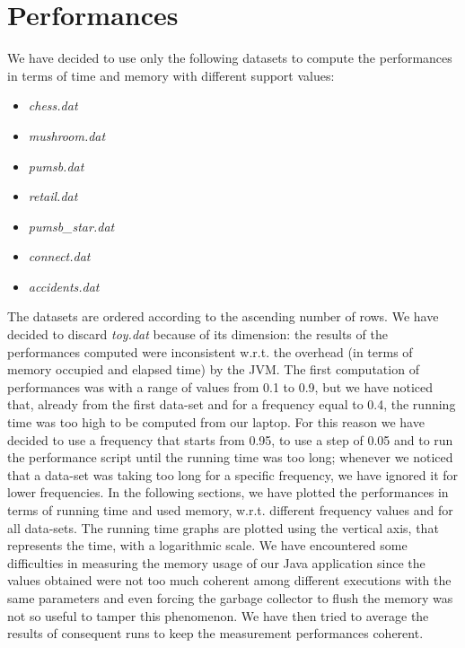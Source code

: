 \documentclass[11pt, a4paper]{article}
\begin{document}
	\section{Performances}
		We have decided to use only the following datasets to compute the performances in terms of time and memory with different support values:
		\begin{multicols}{2}
			\begin{itemize}
				\item \textit{chess.dat}
				\item \textit{mushroom.dat}
				\item \textit{pumsb.dat}
				\item \textit{retail.dat}
				\item \textit{pumsb\_star.dat}
				\item \textit{connect.dat}
				\item \textit{accidents.dat}
			\end{itemize}
		\end{multicols}
		\noindent
		The datasets are ordered according to the ascending number of rows.
		\newline\noindent
		We have decided to discard \textit{toy.dat} because of its dimension: the results of the performances computed were inconsistent w.r.t. the overhead (in terms of memory occupied and elapsed time) by the JVM.
		\newline\newline
		\noindent
		The first computation of performances was with a range of values from 0.1 to 0.9, but we have noticed that, already from the first data-set and for a frequency equal to 0.4, the running time was too high to be computed from our laptop.\newline
		For this reason we have decided to use a frequency that starts from 0.95, to use a step of 0.05 and to run the performance script until the running time was too long; whenever we noticed that a data-set was taking too long for a specific frequency, we have ignored it for lower frequencies.\newline\newline
		In the following sections, we have plotted the performances in terms of running time and used memory, w.r.t. different frequency values and for all data-sets. The running time graphs are plotted using the vertical axis, that represents the time, with a logarithmic scale.\newline
		We have encountered some difficulties in measuring the memory usage of our Java application since the values obtained were not too much coherent among different executions with the same parameters and even forcing the garbage collector to flush the memory was not so useful to tamper this phenomenon. We have then tried to average the results of consequent runs to keep the measurement performances coherent.
\end{document}
